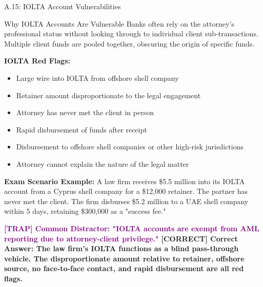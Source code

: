 \documentclass[11pt,a4paper]{beamer}
\newcommand{\trap}[1]{\textcolor{purple}{\textbf{[TRAP] #1}}}
\newcommand{\correct}[1]{\textcolor{green!50!black}{\textbf{[CORRECT] #1}}}
\begin{document}
	\begin{frame}{A.15: IOLTA Account Vulnerabilities}
		\begin{block}{Why IOLTA Accounts Are Vulnerable}
			Banks often rely on the attorney's professional status without looking through to individual client sub-transactions. Multiple client funds are pooled together, obscuring the origin of specific funds.
		\end{block}
		\textbf{IOLTA Red Flags:}
		\begin{itemize}
			\item Large wire into IOLTA from offshore shell company
			\item Retainer amount disproportionate to the legal engagement
			\item Attorney has never met the client in person
			\item Rapid disbursement of funds after receipt
			\item Disbursement to offshore shell companies or other high-risk jurisdictions
			\item Attorney cannot explain the nature of the legal matter
		\end{itemize}
		\textbf{Exam Scenario Example:}
		A law firm receives \$5.5 million into its IOLTA account from a Cyprus shell company for a \$12,000 retainer. The partner has never met the client. The firm disburses \$5.2 million to a UAE shell company within 5 days, retaining \$300,000 as a "success fee."
		
		\trap{Common Distractor: "IOLTA accounts are exempt from AML reporting due to attorney-client privilege."}
		\correct{Correct Answer: The law firm's IOLTA functions as a blind pass-through vehicle. The disproportionate amount relative to retainer, offshore source, no face-to-face contact, and rapid disbursement are all red flags.}
	\end{frame}
	
	
\end{document}
